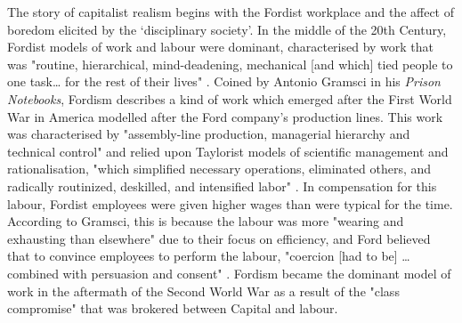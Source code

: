 The story of capitalist realism begins with the Fordist workplace and the affect of boredom elicited by the `disciplinary society'. In the middle of the 20th Century, Fordist models of work and labour were dominant, characterised by work that was "routine, hierarchical, mind-deadening, mechanical [and which] tied people to one task\ldots{} for the rest of their lives" \citep[p. 51]{horgan_lost_2021}. Coined by Antonio Gramsci in his \emph{Prison Notebooks}, Fordism describes a kind of work which emerged after the First World War in America modelled after the Ford company's production lines. This work was characterised by "assembly-line production, managerial hierarchy and technical control" and relied upon Taylorist models of scientific management and rationalisation, "which simplified necessary operations, eliminated others, and radically routinized, deskilled, and intensified labor" \citep[p. 34]{antonio_new_2000}. In compensation for this labour, Fordist employees were given higher wages than were typical for the time. According to Gramsci, this is because the labour was more "wearing and exhausting than elsewhere" \citeyearpar[pp. 311–312]{gramsci_selections_2007} due to their focus on efficiency, and Ford believed that to convince employees to perform the labour, "coercion [had to be] \ldots{} combined with persuasion and consent" \citeyearpar[p. 310]{gramsci_selections_2007}. Fordism became the dominant model of work in the aftermath of the Second World War as a result of the "class compromise" \citep[p. 10]{harvey_brief_2007} that was brokered between Capital and labour. 

